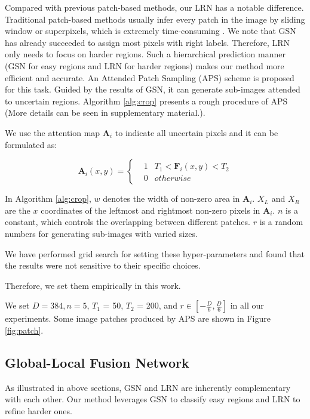 Compared with previous patch-based methods, our LRN has a notable difference. Traditional patch-based methods usually infer every patch in the image by sliding window or superpixels, which is extremely time-consuming . We note that GSN has already succeeded to assign most pixels with right labels. Therefore, LRN only needs to focus on harder regions. Such a hierarchical prediction manner (GSN for easy regions and LRN for harder regions) makes our method more efficient and accurate. An Attended Patch Sampling (APS) scheme is proposed for this task. Guided by the results of GSN, it can generate sub-images attended to uncertain regions. Algorithm \ref{alg:crop} presents a rough procedure of APS (More details can be seen in supplementary material.).

We use the attention map $\bm{A}_i$ to indicate all uncertain pixels and it can be formulated as:

\begin{equation}\label{Ai}

\bm{A}_{i}(x,y)=
\left\{
\begin{aligned}
&1    &  T_1<\bm{F}_i(x,y)<T_2\\
&0    &otherwise
\end{aligned}
\right.
\end{equation}

In Algorithm \ref{alg:crop}, $w$ denotes the width of non-zero area in $\bm{A}_i$. $X_L$ and $X_R$ are the $x$ coordinates of the leftmost and rightmost non-zero pixels in $\bm{A}_i$. $n$ is a constant, which controls the overlapping between different patches. $r$ is a random numbers for generating sub-images with varied sizes.

We have performed grid search for setting these hyper-parameters and found that the results were not sensitive to their specific choices.

Therefore, we set them empirically in this work.

We set $D=384, n = 5$, $T_1$ = 50, $T_2$ = 200, and $r\in [-\frac{D}{6}, \frac{D}{6}]$ in all our experiments. Some image patches produced by APS are shown in Figure \ref{fig:patch}.

\subsection{Global-Local Fusion Network}\label{44}

As illustrated in above sections, GSN and LRN are inherently complementary with each other. Our method leverages GSN to classify easy regions and LRN to refine harder ones.

